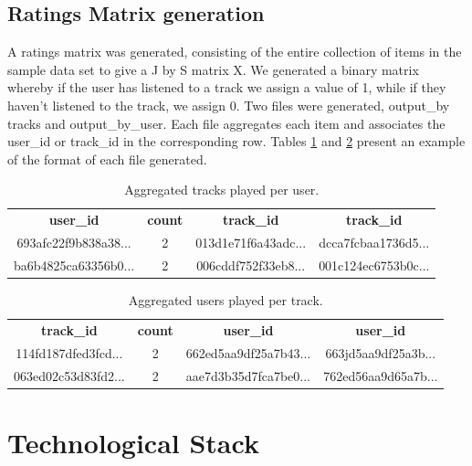 \documentclass{article} %
\begin{document}
\subsection{Ratings Matrix generation}

A ratings matrix was generated, consisting of the entire collection of items in the sample data set to give a J by S matrix X. We generated a binary matrix whereby if the user has listened to a track we assign a value of 1, while if they haven't listened to the track, we assign 0. Two files were generated, output\_by tracks and output\_by\_user. Each file aggregates each item and associates the user\_id or track\_id in the corresponding row. Tables \ref{table:5} and \ref{table:6} present an example of the format of each file generated.

\begin{table}[!htbp]
\caption{Aggregated tracks played per user.}
\label{table:5}
\begin{center}
\begin{tabular}{c c c c}
\textbf{user\_id} & \textbf{count} & \textbf{track\_id} & \textbf{track\_id}\\
693afc22f9b838a38... & 2 & 013d1e71\-f6a4\-3adc... & dcca7fcb\-aa17\-36d5...\\
ba6b4825ca63356b0... & 2 & 006cddf7\-52f3\-3eb8... & 001c124e\-c675\-3b0c...\\
\end{tabular}
\end{center}
\end{table}

\begin{table}[!htbp]
\caption{Aggregated users played per track.}
\label{table:6}
\begin{center}
\begin{tabular}{c c c c}
\textbf{track\_id} & \textbf{count} & \textbf{user\_id} & \textbf{user\_id}\\
114fd187\-dfed\-3fcd... & 2 &  662ed5aa9df25a7b43... &  663jd5aa9df25a3b...\\
063ed02c\-53d8\-3fd2... & 2 &  aae7d3b35d7fca7be0... &  762ed56aa9d65a7b...\\
\end{tabular}
\end{center}
\end{table}

\section{Technological Stack}
\end{document}
